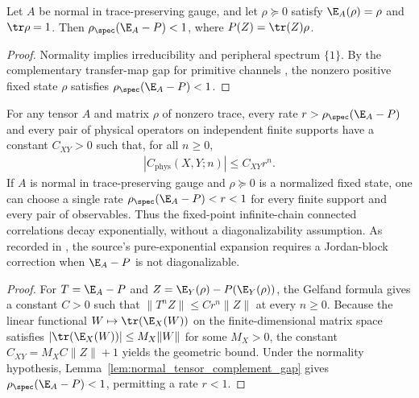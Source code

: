 \begin{lemma}
    \label{lem:normal_tensor_complement_gap}
    \leanok
    Let $A$ be normal in trace-preserving gauge, and let $\rho\succeq0$ satisfy
    $\E_A(\rho)=\rho$ and $\tr\rho=1$. Then
    $\rho_{\spec}(\E_A-P)<1$, where $P(Z)=\tr(Z)\rho$.
\end{lemma}
\begin{proof}
    \leanok
    Normality implies irreducibility and peripheral spectrum $\{1\}$.
    By the complementary transfer-map gap for primitive channels
    \cite[``Complementary transfer-map gap for primitive maps'']{QICLean2026Blueprint},
    the nonzero positive fixed state $\rho$ satisfies $\rho_{\spec}(\E_A-P)<1$.
\end{proof}

\begin{lemma}%
    \label{thm:physical_correlator_tp_bound}
    \leanok
    For any tensor $A$ and matrix $\rho$ of nonzero trace, every rate
    $r>\rho_{\spec}(\E_A-P)$ and every pair of physical operators on independent
    finite supports have a constant $C_{XY}>0$ such that, for all $n\geq0$,
    \begin{align}
        |C_{\mathrm{phys}}(X,Y;n)|\leq C_{XY}r^n.
        \label{eq:correlations_decay_bound}
    \end{align}
    If $A$ is normal in trace-preserving gauge and $\rho\succeq0$ is a
    normalized fixed state, one can choose a single rate
    $\rho_{\spec}(\E_A-P)<r<1$ for every finite support and every pair of
    observables. Thus the fixed-point infinite-chain connected correlations
    decay exponentially, without a diagonalizability assumption.
    As recorded in
    \cite{gap:cpgsv21_correlator_diagonalizable_expansion}, the source's
    pure-exponential expansion requires a Jordan-block correction when
    $\E_A-P$ is not diagonalizable.
\end{lemma}
\begin{proof}
    \leanok
    For $T=\E_A-P$ and $Z=\E_Y(\rho)-P(\E_Y(\rho))$,
    the Gelfand formula gives a constant $C>0$ such that
    $\|T^nZ\|\leq Cr^n\|Z\|$ at every $n\geq0$.
    Because the linear functional $W\mapsto\tr(\E_X(W))$ on the finite-dimensional
    matrix space satisfies $|\tr(\E_X(W))|\leq M_X\|W\|$ for some $M_X>0$,
    the constant $C_{XY}=M_XC\|Z\|+1$ yields the geometric bound.
    Under the normality hypothesis, Lemma~\ref{lem:normal_tensor_complement_gap}
    gives $\rho_{\spec}(\E_A-P)<1$, permitting a rate $r<1$.
\end{proof}

